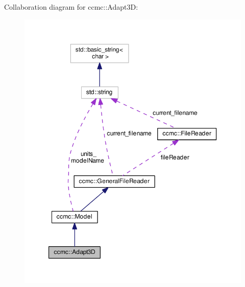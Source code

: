 Collaboration diagram for ccmc\-:\-:Adapt3\-D\-:
\nopagebreak
\begin{figure}[H]
\begin{center}
\leavevmode
\includegraphics[width=350pt]{classccmc_1_1_adapt3_d__coll__graph}
\end{center}
\end{figure}

